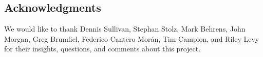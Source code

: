 
\subsection*{Acknowledgments} We would like to thank Dennis Sullivan, Stephan Stolz, Mark Behrens, John Morgan, Greg Brumfiel, Federico Cantero Mor\'an, Tim Campion, and Riley Levy for their insights, questions, and comments about this project.